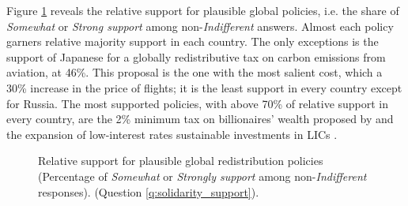 \documentclass[12pt,english]{article}
\begin{document}
\begin{bibunit}
Figure \ref{fig:solidarity_support_share} reveals the relative support for plausible global policies, %
i.e. the share of \textit{Somewhat} or \textit{Strong support} among non-\textit{Indifferent} answers. Almost each policy garners relative majority support in each country. The only exceptions is the support of Japanese for a globally redistributive tax on carbon emissions from aviation, at 46\%. %
This proposal is the one with the most salient cost, which a 30\% increase in the price of flights; it is the least support in every country except for Russia. The most supported policies, with above 70\% of relative support in every country, are the 2\% minimum tax on billionaires' wealth proposed by \cite{zucman_blueprint_2024} and the expansion of low-interest rates sustainable investments in LICs \citep{bridgetown_initiative_bridgetown_2025}. 

\begin{figure}[h!]
    \caption[Relative support for plausible global redistribution policies]{Relative support for plausible global redistribution policies (Percentage of \textit{Somewhat} or \textit{Strongly support} among non-\textit{Indifferent} responses). (Question \ref{q:solidarity_support}).
    }\label{fig:solidarity_support_share}
\end{figure}


\end{bibunit}
\end{document}
